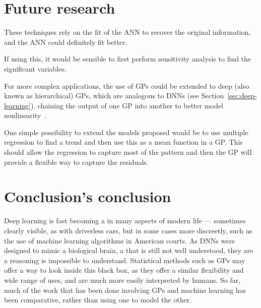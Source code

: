 \section{Future research}

These techniques rely on the fit of the \acl{ANN} to recover the original information, and the \acl{ANN} could definitely fit better.

If using this, it would be sensible to first perform sensitivity analysis to find the significant variables.

For more complex applications, the use of \acp{GP} could be extended to deep (also known as hierarchical) \acp{GP}, which are analogous to \acp{DNN} (see Section~\ref{sec:deep-learning}).
 chaining the output of one \ac{GP} into another to better model nonlinearity~\autocite{damianou2013}.

One simple possibility to extend the models proposed would be to use multiple regression to find a trend and then use this as a mean function in a \ac{GP}.
This should allow the regression to capture most of the pattern and then the \ac{GP} will provide a flexible way to capture the residuals.

\section{Conclusion's conclusion}

Deep learning is fast becoming a  in many aspects of modern life --- sometimes clearly visible, as with driverless cars, but in some cases more discreetly, such as the use of machine learning algorithms in American courts.
As \acp{DNN} were designed to mimic a biological brain, a  that is still not well understood, they are a   reasoning is impossible to understand.
Statistical methods such as \acp{GP} may offer a way to look inside this black box, as they offer a similar flexibility and wide range of uses, and are much more easily interpreted by humans.
So far, much of the work that has been done involving \acp{GP} and machine learning has been comparative, rather than using one to model the other.

